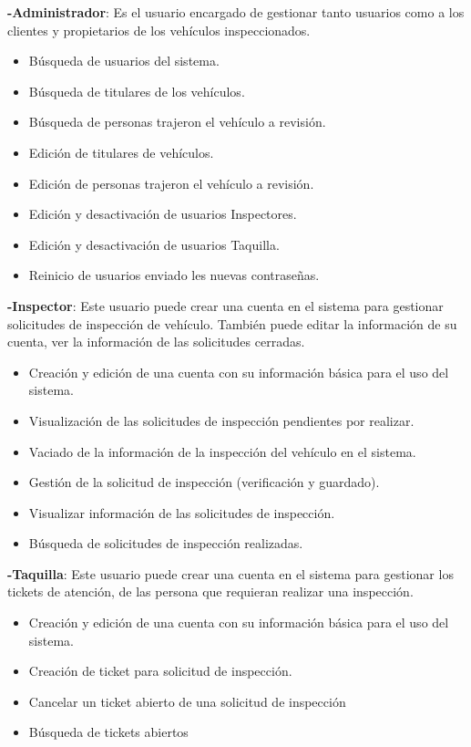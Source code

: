 \textbf{-Administrador}: Es el usuario encargado de gestionar tanto usuarios como a los clientes y propietarios de los vehículos inspeccionados.
	\begin{itemize}
		\item Búsqueda de usuarios del sistema.
		\item Búsqueda de titulares de los vehículos.
		\item Búsqueda de personas trajeron el vehículo a revisión. 
		\item Edición de titulares de vehículos.
		\item Edición de personas trajeron el vehículo a revisión.
		\item Edición y desactivación de usuarios Inspectores.
		\item Edición y desactivación de usuarios Taquilla.
		\item Reinicio de usuarios enviado les nuevas contraseñas.
	\end{itemize}

\textbf{-Inspector}: Este usuario puede crear una cuenta en el sistema para gestionar solicitudes de inspección de vehículo. También puede editar la información de su cuenta, ver la información de las solicitudes cerradas. 
	\begin{itemize}
		\item Creación y edición de una cuenta con su información básica para el uso del sistema.
		\item Visualización de las solicitudes de inspección pendientes por realizar.
		\item Vaciado de la información de la inspección del vehículo en el sistema.
		\item Gestión de la solicitud de inspección (verificación y guardado). 
		\item Visualizar información de las solicitudes de inspección.
		\item Búsqueda de solicitudes de inspección realizadas.
	\end{itemize}

\textbf{-Taquilla}: Este usuario puede crear una cuenta en el sistema para gestionar los tickets de atención, de las persona que requieran realizar una inspección.
	\begin{itemize}
		\item Creación y edición de una cuenta con su información básica para el uso del sistema.
		\item Creación de ticket para solicitud de inspección.
		\item Cancelar un ticket abierto de una solicitud de inspección 
		\item Búsqueda de tickets abiertos
	\end{itemize}



